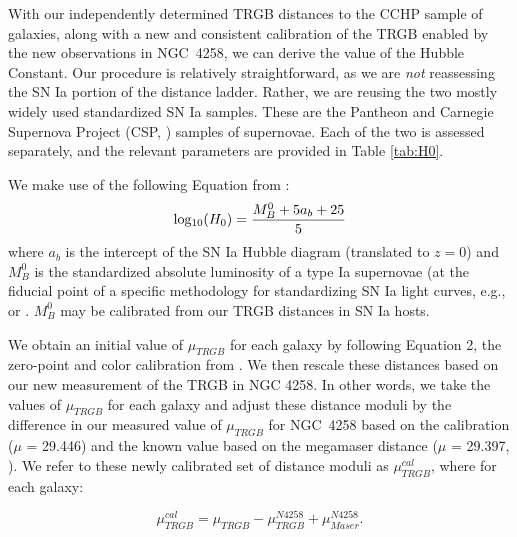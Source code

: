 \documentclass[twocolumn]{aastex62}
\begin{document}
With our independently determined TRGB distances to the CCHP sample of galaxies, along with a new and consistent calibration of the TRGB enabled by the new observations in NGC~4258, we can derive the value of the Hubble Constant. Our procedure is relatively straightforward, as we are \textit{not} reassessing the SN Ia portion of the distance ladder. Rather, we are reusing the two mostly widely used standardized SN Ia samples. These are the Pantheon \citep{2018ApJ...859..101S} and Carnegie Supernova Project (CSP, \citealt{2006PASP..118....2H,2017AJ....154..211K}) samples of supernovae.  Each of the two is assessed separately, and the relevant parameters are provided in Table \ref{tab:H0}.

We make use of the following Equation from \cite{2016ApJ...826...56R}:
\begin{equation}
    {\rm log_{10}}(H_{0}) = \frac{M^{0}_{B} + 5a_{b} +25}{5}
\end{equation}
where $a_b$ is the intercept of the SN Ia Hubble diagram (translated to $z=0$) and $M^{0}_{B}$ is the standardized absolute luminosity of a type Ia supernovae (at the fiducial point of a specific methodology for standardizing SN Ia light curves, e.g., \cite{2018ApJ...859..101S} or \cite{2018ApJ...869...56B}. $M^{0}_{B}$ may be calibrated from our TRGB distances in SN Ia hosts. 

We obtain an initial value of $\mu_{TRGB}$ for each galaxy by following Equation 2, the zero-point and color calibration from \cite{2007ApJ...661..815R}. We then rescale these distances based on our new measurement of the TRGB in NGC 4258. In other words, we take the values of $\mu_{TRGB}$ for each galaxy and adjust these distance moduli by the difference in our measured value of $\mu_{TRGB}$ for NGC~4258 based on the \cite{2007ApJ...661..815R} calibration ($\mu$ = 29.446) and the known value based on the megamaser distance ($\mu$ = 29.397, \citealt{2019ApJ...886L..27R}). We refer to these newly calibrated set of distance moduli as $\mu_{TRGB}^{cal}$, where for each galaxy:

\begin{equation}
     \mu_{TRGB}^{cal} = \mu_{TRGB} - \mu_{TRGB}^{N4258} + \mu_{Maser}^{N4258}. 
\end{equation}
\end{document}
